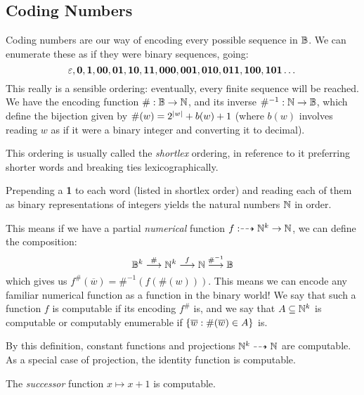 \documentclass{article}
\begin{document}
\subsection{Coding Numbers}

Coding numbers are our way of encoding every possible sequence in $\mathbb{B}$. We can enumerate these as if they were binary sequences, going:
\[
	\varepsilon, \textbf{0}, \textbf{1},
	\textbf{00}, \textbf{01}, \textbf{10}, \textbf{11},
	\textbf{000}, \textbf{001}, \textbf{010}, \textbf{011},
	\textbf{100}, \textbf{101} \dots
\]
This really is a sensible ordering: eventually, every finite sequence will be reached. We have the encoding function $\# : \mathbb{B} \to \mathbb{N}$, and its inverse $\#^{-1} : \mathbb{N} \to \mathbb{B}$, which define the bijection given by $\#(w) = 2^{\left\lvert w \right\rvert} + b(w) + 1$ (where $b(w)$ involves reading $w$ as if it were a binary integer and converting it to decimal).

\begin{note}
	This ordering is usually called the \textit{shortlex} ordering, in reference to it preferring shorter words and breaking ties lexicographically.
\end{note}

\begin{note}
	Prepending a \textbf{1} to each word (listed in shortlex order) and reading each of them as binary representations of integers yields the natural numbers $\mathbb{N}$ in order.
\end{note}

This means if we have a partial \textit{numerical} function $f: \dashrightarrow \mathbb{N}^k \to \mathbb{N}$, we can define the composition:
\[
	\mathbb{B}^k \stackrel{\#}{\longrightarrow} \mathbb{N}^k \stackrel{f}{\longrightarrow} \mathbb{N} \stackrel{\#^{-1}}{\longrightarrow} \mathbb{B}
\]
which gives us $f^\#(\overline w) = \#^{-1}(f(\#(w)))$. This means we can encode any familiar numerical function as a function in the binary world!
We say that such a function $f$ is computable if its encoding $f^\#$ is, and we say that $A \subseteq \mathbb{N}^k$ is computable or computably enumerable if $\left\lbrace \overline w: \#(\overline w) \in A \right\rbrace$ is.

\begin{corollary}
	By this definition, constant functions and projections $\mathbb{N}^k \dashrightarrow \mathbb{N}$ are computable. As a special case of projection, the identity function is computable.
\end{corollary}

\begin{proposition}
	The \textit{successor} function $x \mapsto x + 1$ is computable.
\end{proposition}
\end{document}
